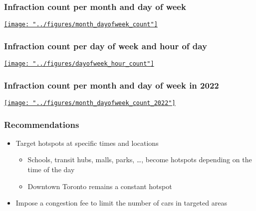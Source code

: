 \documentclass[fleqn]{beamer}
\begin{document}
\begin{frame}
  \frametitle{Infraction count per month and day of week}
  \centering
  \href{https://sariaslaso.github.io/parking_toronto/figures/month_dayofweek_count.html}{\texttt{[image: "../figures/month\_dayofweek\_count"]}}
\end{frame}

\begin{frame}
  \frametitle{Infraction count per day of week and hour of day}
  \centering
  \href{https://sariaslaso.github.io/parking_toronto/figures/dayofweek_hour_count.html}{\texttt{[image: "../figures/dayofweek\_hour\_count"]}} 
\end{frame}

\begin{frame}
  \frametitle{Infraction count per month and day of week in 2022}
  \centering
  \href{https://sariaslaso.github.io/parking_toronto/figures/month_dayofweek_count_2022.html}{\texttt{[image: "../figures/month\_dayofweek\_count\_2022"]}} 
\end{frame}

\begin{frame}
  \frametitle{Recommendations}
  \begin{itemize}
  \item Target hotspots at specific times and locations
    \begin{itemize}
    \item Schools, transit hubs, malls, parks, \dots, become hotspots
    depending on the time of the day
  \item Downtown Toronto remains a constant hotspot
    \end{itemize}
    \item Impose a congestion fee to limit the number of cars in
      targeted areas
  \end{itemize}
\end{frame}
\end{document}
